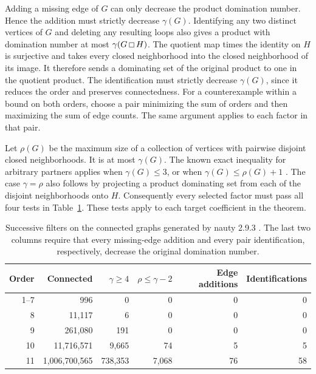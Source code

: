 \documentclass[10pt]{article}
\newcommand{\gp}{\mathbin{\vcenter{\hbox{\setlength{\fboxsep}{0pt}%
  \fbox{\rule{0pt}{.51em}\rule{.51em}{0pt}}}}}}
\begin{document}
Adding a missing edge of \(G\) can only decrease the product domination number.
Hence the addition must strictly decrease \(\gamma(G)\). Identifying any
two distinct vertices of \(G\) and deleting any resulting loops also gives a
product with domination number at most \(\gamma(G\gp H)\). The quotient map
times the identity on \(H\) is surjective and takes every closed neighborhood
into the closed neighborhood of its image. It therefore sends a dominating
set of the original product to one in the quotient product. The identification
must strictly decrease \(\gamma(G)\), since it reduces the order and preserves
connectedness. For a counterexample within a bound on both orders, choose
a pair minimizing the sum of orders and then maximizing the sum of edge
counts. The same argument applies to each factor in that pair.

Let \(\rho(G)\) be the maximum size of a collection of vertices with pairwise
disjoint closed neighborhoods. It is at most \(\gamma(G)\). The known exact
inequality for arbitrary partners applies when \(\gamma(G)\le3\), or when
\(\gamma(G)\le\rho(G)+1\) \cite{lowgamma,half,survey}. The case
\(\gamma=\rho\) also follows by projecting a product dominating set from
each of the disjoint neighborhoods onto \(H\). Consequently every selected
factor must pass all four tests in Table~\ref{tab:scan}. These tests apply
to each target coefficient in the theorem.

\begin{table}[h]
\centering
\begin{tabular}{@{}rrrrrr@{}}
\toprule
Order & Connected & \(\gamma\ge4\) & \(\rho\le\gamma-2\) & Edge additions & Identifications\\
\midrule
1--7 & 996 & 0 & 0 & 0 & 0\\
8 & 11,117 & 6 & 0 & 0 & 0\\
9 & 261,080 & 191 & 0 & 0 & 0\\
10 & 11,716,571 & 9,665 & 74 & 5 & 5\\
11 & 1,006,700,565 & 738,353 & 7,068 & 76 & 58\\
\bottomrule
\end{tabular}
\caption{Successive filters on the connected graphs generated by nauty 2.9.3 \cite{nauty}.
The last two columns require that every missing-edge addition and every
pair identification, respectively, decrease the original domination number.}
\label{tab:scan}
\end{table}
\end{document}
